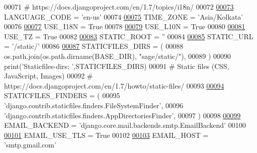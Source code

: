 \begin{DoxyCode}
00071 \textcolor{comment}{# https://docs.djangoproject.com/en/1.7/topics/i18n/}
00072 
\hypertarget{settings_8py_source_l00073}{}\hyperlink{namespacesage_1_1settings_ac5b7a49ef37a25508ecb84453063821a}{00073} LANGUAGE\_CODE = \textcolor{stringliteral}{'en-us'}
00074 
\hypertarget{settings_8py_source_l00075}{}\hyperlink{namespacesage_1_1settings_a07421ef620becc4c93753901abdf83c0}{00075} TIME\_ZONE = \textcolor{stringliteral}{'Asia/Kolkata'}
00076 
\hypertarget{settings_8py_source_l00077}{}\hyperlink{namespacesage_1_1settings_acf5dd02a352695a98f57bef7679a29af}{00077} USE\_I18N = \textcolor{keyword}{True}
00078 
\hypertarget{settings_8py_source_l00079}{}\hyperlink{namespacesage_1_1settings_a9d0e7298d4688c99e0ee9e965d950de0}{00079} USE\_L10N = \textcolor{keyword}{True}
00080 
\hypertarget{settings_8py_source_l00081}{}\hyperlink{namespacesage_1_1settings_aa385f778cd7bd79cc4c688fec7c101a2}{00081} USE\_TZ = \textcolor{keyword}{True}
00082 
\hypertarget{settings_8py_source_l00083}{}\hyperlink{namespacesage_1_1settings_a91b967847aecdd4d0edfbb0229656929}{00083} STATIC\_ROOT = \textcolor{stringliteral}{''}
00084 
\hypertarget{settings_8py_source_l00085}{}\hyperlink{namespacesage_1_1settings_a0b4647cdde23eaed09c255182a9f576c}{00085} STATIC\_URL = \textcolor{stringliteral}{'/static/'}
00086 
\hypertarget{settings_8py_source_l00087}{}\hyperlink{namespacesage_1_1settings_ac4ae870dea0d58410747ddcbdff2b3d7}{00087} STATICFILES\_DIRS = (
00088         os.path.join(os.path.dirname(BASE\_DIR), \textcolor{stringliteral}{"sage/static/"}),
00089 )
00090 print(\textcolor{stringliteral}{'Staticfiles-dirs: '},STATICFILES\_DIRS)
00091 \textcolor{comment}{# Static files (CSS, JavaScript, Images)}
00092 \textcolor{comment}{# https://docs.djangoproject.com/en/1.7/howto/static-files/}
00093 
\hypertarget{settings_8py_source_l00094}{}\hyperlink{namespacesage_1_1settings_af629022b1da961fa9828f450bc80bd22}{00094} STATICFILES\_FINDERS = (
00095     \textcolor{stringliteral}{'django.contrib.staticfiles.finders.FileSystemFinder'},
00096     \textcolor{stringliteral}{'django.contrib.staticfiles.finders.AppDirectoriesFinder'},
00097 )
00098 
\hypertarget{settings_8py_source_l00099}{}\hyperlink{namespacesage_1_1settings_a2d83ca0a279480aa03599465a0386b17}{00099} EMAIL\_BACKEND = \textcolor{stringliteral}{'django.core.mail.backends.smtp.EmailBackend'}
00100 
\hypertarget{settings_8py_source_l00101}{}\hyperlink{namespacesage_1_1settings_a0fe7c4174cb1b7d03f7b574ae1e5eed9}{00101} EMAIL\_USE\_TLS = \textcolor{keyword}{True}
00102 
\hypertarget{settings_8py_source_l00103}{}\hyperlink{namespacesage_1_1settings_a594329fe15c9680f523afaab779411ed}{00103} EMAIL\_HOST = \textcolor{stringliteral}{'smtp.gmail.com'}

\end{DoxyCode}
